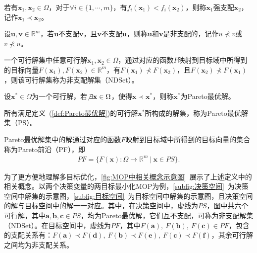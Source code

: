 \begin{definition}[强支配]
    \label{def:强支配}
    若有$\mathbf{x}_1,\mathbf{x}_2 \in \Omega$，对于$\forall i \in \{ 1, \cdots, m \}$，有$f_i(\mathbf{x}_1) < f_i(\mathbf{x}_2)$，则称$\mathbf{x}_1$强支配$\mathbf{x}_2$，记作$\mathbf{x}_1 \prec \mathbf{x}_2$。
\end{definition}
\par
\begin{definition}[非支配]
    \label{def:非支配}
    设$\mathbf{u}, \mathbf{v} \in \mathbb{R}^m$，若$\mathbf{u}$不支配$\mathbf{v}$，且$\mathbf{v}$不支配$\mathbf{u}$，则称$\mathbf{u}$和$\mathbf{v}$是非支配的，记作$u \not \prec v$或$v \not \prec u$。
\end{definition}
\par
\begin{definition}
    \label{def:非支配解集}
    一个可行解集中任意可行解$\mathbf{x}_1, \mathbf{x}_2 \in \Omega$，通过对应的函数$F$映射到目标域中所得到的目标向量$F(\mathbf{x}_1), F(\mathbf{x}_2) \in \mathbb{R}^m$，有$F(\mathbf{x}_1) \not \prec F(\mathbf{x}_2)$，且$F(\mathbf{x}_2) \not \prec F(\mathbf{x}_1)$，则该可行解集称为非支配解集（NDSet）。
\end{definition}
\par
\begin{definition}[Pareto最优解]
    \label{def:Pareto最优解}
    设$\mathbf{x}^* \in \Omega$为一个可行解，若$\not \exists \mathbf{x} \in \Omega$，使得$\mathbf{x} \prec \mathbf{x}^*$，则称$\mathbf{x}^*$为Pareto最优解。
\end{definition}
\par
\begin{definition}
    \label{def:Pareto最优解集}
    所有满足定义~(\ref{def:Pareto最优解})的可行解$\mathbf{x}^*$所构成的解集，称为Pareto最优解集（PS）。
\end{definition}
\par
\begin{definition}
    \label{def:Pareto前沿}
    Pareto最优解集中的解通过对应的函数$F$映射到目标域中所得到的目标向量的集合称为Pareto前沿（PF），即
    \begin{align}
        \label{eq:Pareto前沿}
        PF = \{ F(\mathbf{x}): \Omega \rightarrow \mathbb{R}^m \ | \ \mathbf{x} \in PS \}.
    \end{align}
\end{definition}
\par
为了更方便地理解多目标优化，\autoref{fig:MOP中相关概念示意图}~展示了上述定义中的相关概念。以两个决策变量的两目标最小化MOP为例，\autoref{subfig:决策空间}~为决策空间中解集的示意图，\autoref{subfig:目标空间}~为目标空间中解集的示意图，且决策空间的解与目标空间中的解一一对应。其中，在决策空间中，虚线为$PS$，图中共六个可行解，其中$\mathbf{a}, \mathbf{b}, \mathbf{c} \in PS$，均为Pareto最优解，它们互不支配，可称为非支配解集（NDSet）。在目标空间中，虚线为$PF$，其中$F(\mathbf{a}), \ F(\mathbf{b}), \ F(\mathbf{c}) \in PF$，包含的支配关系有：$F(\mathbf{a}) \prec F(\mathbf{d}), \ F(\mathbf{b}) \prec F(\mathbf{e}), \ F(\mathbf{c}) \prec F(\mathbf{f})$，其余可行解之间均为非支配关系。
